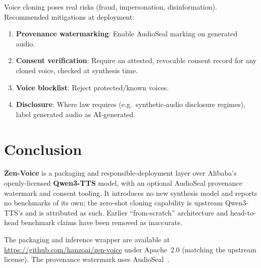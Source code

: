 \documentclass[11pt,a4paper]{article}
\begin{document}
Voice cloning poses real risks (fraud, impersonation, disinformation). Recommended
mitigations at deployment:
\begin{enumerate}
    \item \textbf{Provenance watermarking}: Enable AudioSeal marking on generated audio.
    \item \textbf{Consent verification}: Require an attested, revocable consent record
          for any cloned voice, checked at synthesis time.
    \item \textbf{Voice blocklist}: Reject protected/known voices.
    \item \textbf{Disclosure}: Where law requires (e.g.\ synthetic-audio disclosure
          regimes), label generated audio as AI-generated.
\end{enumerate}

\section{Conclusion}
\label{sec:conclusion}

\textbf{Zen-Voice} is a packaging and responsible-deployment layer over Alibaba's
openly-licensed \textbf{Qwen3-TTS} model, with an optional AudioSeal provenance
watermark and consent tooling. It introduces no new synthesis model and reports no
benchmarks of its own; the zero-shot cloning capability is upstream Qwen3-TTS's and is
attributed as such. Earlier ``from-scratch'' architecture and head-to-head benchmark
claims have been removed as inaccurate.

The packaging and inference wrapper are available at
\url{https://github.com/hanzoai/zen-voice} under Apache~2.0 (matching the upstream
license). The provenance watermark uses AudioSeal~\citep{san2024proactive}.
\end{document}
